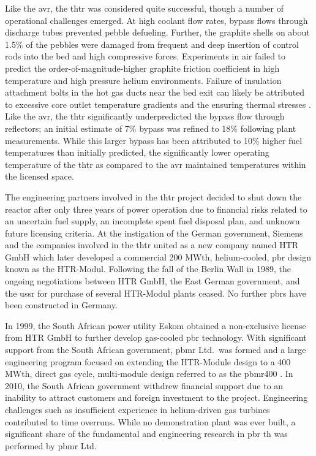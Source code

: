 Like the \gls{avr}, the \gls{thtr} was considered quite successful, though a number of operational challenges emerged. At high coolant flow rates, bypass flows through discharge tubes prevented pebble defueling. Further, the graphite shells on about 1.5\% of the pebbles were damaged from frequent and deep insertion of control rods into the bed and high compressive forces. Experiments in air failed to predict the order-of-magnitude-higher graphite friction coefficient in high temperature and high pressure helium environments. Failure of insulation attachment bolts in the hot gas ducts near the bed exit can likely be attributed to excessive core outlet temperature gradients and the ensuring thermal stresses \cite{moormann}. Like the \gls{avr}, the \gls{thtr} significantly underpredicted the bypass flow through reflectors; an initial estimate of 7\% bypass was refined to 18\% following plant measurements. While this larger bypass has been attributed to 10\% higher fuel temperatures than initially predicted, the significantly lower operating temperature of the \gls{thtr} as compared to the \gls{avr} maintained temperatures within the licensed space.

The engineering partners involved in the \gls{thtr} project decided to shut down the reactor after only three years of power operation due to financial risks related to an uncertain fuel supply, an incomplete spent fuel disposal plan, and unknown future licensing criteria. At the instigation of the German government, Siemens and the companies involved in the \gls{thtr} united as a new company named HTR GmbH which later developed a commercial 200 MWth, helium-cooled, \gls{pbr} design known as the HTR-Modul. Following the fall of the Berlin Wall in 1989, the ongoing negotiations between HTR GmbH, the East German government, and the \gls{ussr} for purchase of several HTR-Modul plants ceased. No further \glspl{pbr} have been constructed in Germany.

In 1999, the South African power utility Eskom obtained a non-exclusive license from HTR GmbH to further develop gas-cooled \gls{pbr} technology. With significant support from the South African government, \gls{pbmr} Ltd.\ was formed and a large engineering program focused on extending the HTR-Module design to a 400 MWth, direct gas cycle, multi-module design referred to as the \gls{pbmr400} \cite{thomas, koster}. In 2010, the South African government withdrew financial support due to an inability to attract customers and foreign investment to the project. Engineering challenges such as insufficient experience in helium-driven gas turbines contributed to time overruns. While no demonstration plant was ever built, a significant share of the fundamental and engineering research in \gls{pbr} \gls{th} was performed by \gls{pbmr} Ltd.


